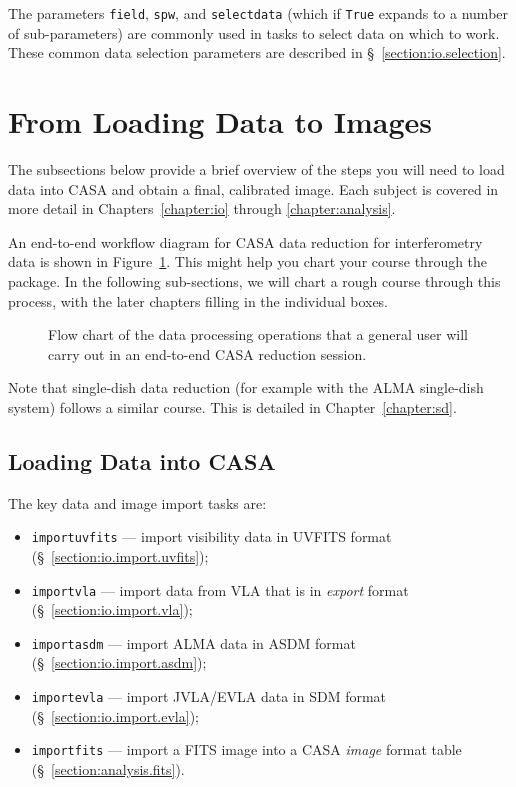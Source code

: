 The parameters {\tt field}, {\tt spw}, and {\tt selectdata} (which if
{\tt True} expands to a number of sub-parameters) are commonly used in
tasks to select data on which to work.  These common data selection
parameters are described in \S~\ref{section:io.selection}.


\section{From Loading Data to Images}
\label{section:intro.walkthru}

The subsections below provide a brief overview of the steps you will
need to load data into CASA and obtain a final, calibrated image.
Each subject is covered in more detail in Chapters~\ref{chapter:io}
through \ref{chapter:analysis}.

An end-to-end workflow diagram for CASA data reduction for
interferometry data is shown in Figure~\ref{fig:casaflow}.  
This might help you chart your course through the package.
In the following sub-sections, we will chart a rough course through
this process, with the later chapters filling in the individual
boxes.

\begin{figure}[h!]
\caption{\label{fig:casaflow}
Flow chart of the data processing operations that a general 
user will carry out in an end-to-end CASA reduction session.}
\hrulefill
\end{figure}

Note that single-dish data reduction (for example with the ALMA
single-dish system) follows a similar course.  This is detailed
in Chapter~\ref{chapter:sd}.

\subsection{Loading Data into CASA}
\label{section:intro.walkthru.load}

The key data and image import tasks are:
\begin{itemize}
   \item {\tt importuvfits} --- import visibility data in UVFITS
         format (\S~\ref{section:io.import.uvfits});
   \item {\tt importvla} --- import data from VLA that is in 
         {\it export} format (\S~\ref{section:io.import.vla});
   \item {\tt importasdm} --- import ALMA data in ASDM format 
         (\S~\ref{section:io.import.asdm});
   \item {\tt importevla} --- import JVLA/EVLA data in SDM format 
         (\S~\ref{section:io.import.evla});
   \item {\tt importfits} --- import a FITS image into a CASA  
         {\it image} format table (\S~\ref{section:analysis.fits}).
\end{itemize}

